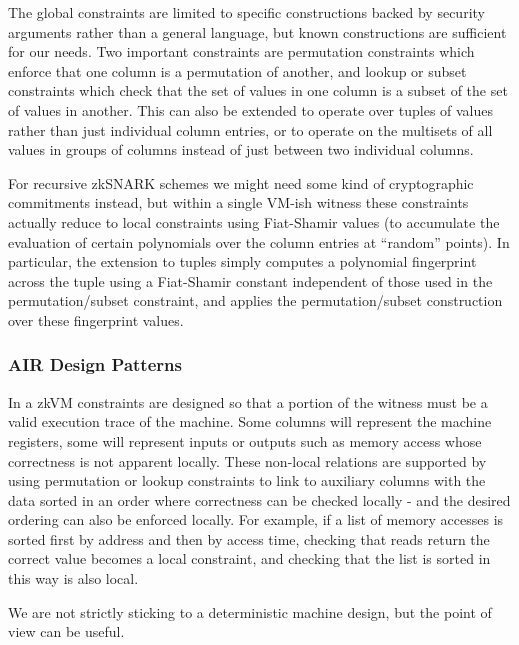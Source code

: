 \documentclass{article}
\theoremstyle{plain}
\theoremstyle{definition}
\begin{document}
The global constraints are limited to specific constructions backed by
security arguments rather than a general language, but known
constructions are sufficient for our needs. Two important constraints
are permutation constraints which enforce that one column is a
permutation of another, and lookup or subset constraints which check
that the set of values in one column is a subset of the set of values in
another. This can also be extended to operate over tuples of values
rather than just individual column entries, or to operate on the
multisets of all values in groups of columns instead of just between two
individual columns.

For recursive zkSNARK schemes we might need some kind of cryptographic
commitments instead, but within a single VM-ish witness these
constraints actually reduce to local constraints using Fiat-Shamir
values (to accumulate the evaluation of certain polynomials over the
column entries at ``random'' points). In particular, the extension to
tuples simply computes a polynomial fingerprint across the tuple using a
Fiat-Shamir constant independent of those used in the permutation/subset
constraint, and applies the permutation/subset construction over these
fingerprint values.

\subsubsection{AIR Design Patterns}\label{air-design-patterns}


In a zkVM constraints are designed so that a portion of the witness must
be a valid execution trace of the machine. Some columns will represent
the machine registers, some will represent inputs or outputs such as
memory access whose correctness is not apparent locally. These non-local
relations are supported by using permutation or lookup constraints to
link to auxiliary columns with the data sorted in an order where
correctness can be checked locally - and the desired ordering can also
be enforced locally. For example, if a list of memory accesses is sorted
first by address and then by access time, checking that reads return the
correct value becomes a local constraint, and checking that the list is
sorted in this way is also local.

We are not strictly sticking to a deterministic machine design, but the
point of view can be useful.
\end{document}
